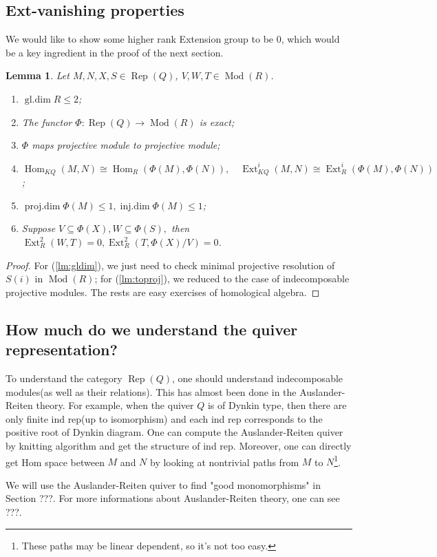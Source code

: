 \documentclass[reqno,11pt]{amsart}
\numberwithin{equation}{section}
\theoremstyle{plain}
\newtheorem{lemma}[theorem]{Lemma}
\theoremstyle{plain}
\numberwithin{equation}{section}
\theoremstyle{remark}
\DeclareMathOperator{\Rep}{\operatorname{Rep}}
\DeclareMathOperator{\Mod}{\operatorname{Mod}}
\DeclareMathOperator{\Hom}{\operatorname{Hom}}
\DeclareMathOperator{\Ext}{\operatorname{Ext}}
\DeclareMathOperator{\gldim}{\operatorname{gl.dim}}
\DeclareMathOperator{\projdim}{\operatorname{proj.dim}}
\DeclareMathOperator{\injdim}{\operatorname{inj.dim}}
\begin{document}
\subsection{Ext-vanishing properties}
We would like to show some higher rank Extension group to be 0, which would be a key ingredient in the proof of the next section.

\begin{lemma}
Let $M,N,X,S \in \Rep(Q)$, $V,W,T \in \Mod(R)$.
\begin{enumerate}[(1)]
	\item $\gldim R \leqslant 2$;\label{lm:gldim}
	\item The functor $\Phi:\Rep(Q) \longrightarrow \Mod(R)$ is exact;
	\item $\Phi$ maps projective module to projective module;\label{lm:toproj}
	\item $\Hom_{KQ}(M,N) \cong \Hom_{R}(\Phi(M),\Phi(N)),\quad\Ext^i_{KQ}(M,N) \cong \Ext^i_{R}(\Phi(M),\Phi(N))$;
	\item $\projdim \Phi(M) \leqslant 1, \injdim \Phi(M) \leqslant 1$;
	\item Suppose $V \subseteq \Phi(X), W \subseteq \Phi(S),$ then $\Ext^2_{R}(W,T)=0, \Ext^2_{R}(T,\Phi(X)/V)=0$.
\end{enumerate}
\end{lemma}
\begin{proof}
For (\ref{lm:gldim}), we just need to check minimal projective resolution of $S(i)$ in $\Mod(R)$; for (\ref{lm:toproj}), we reduced to the case of indecomposable projective modules. The rests are easy exercises of homological algebra.
\end{proof}
\subsection{How much do we understand the quiver representation?}
To understand the category $\Rep(Q)$, one should understand indecomposable modules(as well as their relations). This has almost been done in the Auslander-Reiten theory. For example, when the quiver $Q$ is of Dynkin type, then there are only finite ind rep(up to isomorphism) and each ind rep corresponds to the positive root of Dynkin diagram. One can compute the Auslander-Reiten quiver by knitting algorithm and get the structure of ind rep. Moreover, one can directly get Hom space between $M$ and $N$ by looking at nontrivial paths from $M$ to $N$\footnote{These paths may be linear dependent, so it's not too easy.}.

We will use the Auslander-Reiten quiver to find "good monomorphisms" in Section ???. For more informations about Auslander-Reiten theory, one can see ???.
\end{document}

